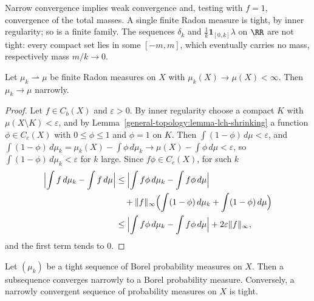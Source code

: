 Narrow convergence implies weak convergence and, testing with $f = 1$, convergence of the total masses. A single finite Radon measure is tight, by inner regularity; so is a finite family. The
sequences $\delta_k$ and $\frac1k\mathbf{1}_{[0, k]}\lambda$ on $\RR$ are not tight: every compact set lies in some $[-m, m]$, which eventually carries no mass, respectively mass $m/k \to 0$.

\begin{lemma}\label{radon-measures:lemma-weak-to-narrow}
Let $\mu_k \rightharpoonup \mu$ be finite Radon measures on $X$ with $\mu_k(X) \to \mu(X) < \infty$. Then $\mu_k \to \mu$ narrowly.
\end{lemma}

\begin{proof}
Let $f \in C_b(X)$ and $\varepsilon > 0$. By inner regularity choose a compact $K$ with $\mu(X \setminus K) < \varepsilon$, and by Lemma~\ref{general-topology:lemma-lch-shrinking} a function $\phi \in C_c(X)$ with
$0 \leq \phi \leq 1$ and $\phi = 1$ on $K$. Then $\int(1 - \phi)\,d\mu < \varepsilon$, and $\int(1 - \phi)\,d\mu_k = \mu_k(X) - \int\phi\,d\mu_k \to \mu(X) - \int\phi\,d\mu < \varepsilon$, so
$\int(1 - \phi)\,d\mu_k < \varepsilon$ for $k$ large. Since $f\phi \in C_c(X)$, for such $k$
\[\begin{aligned}
\Bigl|\int f\,d\mu_k - \int f\,d\mu\Bigr| &\leq \Bigl|\int f\phi\,d\mu_k - \int f\phi\,d\mu\Bigr| \\
&\quad + \|f\|_\infty\Bigl(\int(1 - \phi)\,d\mu_k + \int(1 - \phi)\,d\mu\Bigr) \\
&\leq \Bigl|\int f\phi\,d\mu_k - \int f\phi\,d\mu\Bigr| + 2\varepsilon\|f\|_\infty,
\end{aligned}\]
and the first term tends to $0$.
\end{proof}

\begin{theorem}[Prokhorov]\label{radon-measures:theorem-prokhorov}
Let $(\mu_k)$ be a tight sequence of Borel probability measures on $X$. Then a subsequence converges narrowly to a Borel probability measure. Conversely, a narrowly convergent sequence of
probability measures on $X$ is tight.
\end{theorem}

